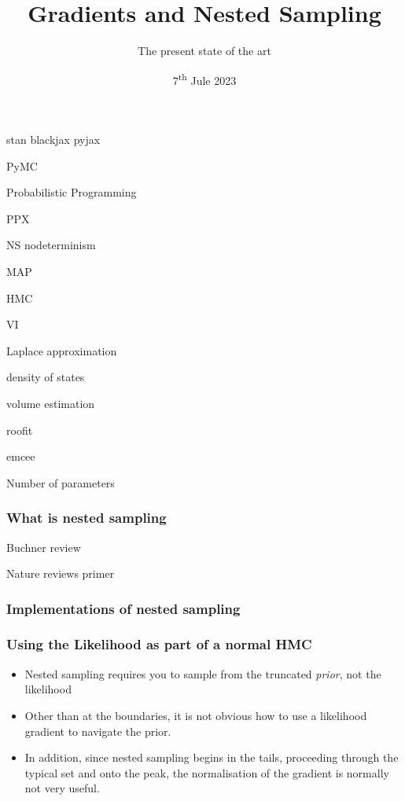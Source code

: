 \documentclass[aspectratio=169]{beamer}
\title{Gradients and Nested Sampling}
\subtitle{The present state of the art}
\date{7\textsuperscript{th} Jule 2023}
\begin{document}
\begin{frame}
    \titlepage
\end{frame}

\begin{frame}
    stan
    blackjax
    pyjax

    PyMC
    
    Probabilistic Programming

    PPX

    NS nodeterminism

    MAP
    
    HMC

    VI

    Laplace approximation

    density of states

    volume estimation

    roofit

    emcee

    Number of parameters
\end{frame}

\begin{frame}
    \frametitle{What is nested sampling}
    
    Buchner review 

    Nature reviews primer 

\end{frame}

\begin{frame}
    \frametitle{Implementations of nested sampling}
\end{frame}


\begin{frame}
    \frametitle{Using the Likelihood as part of a normal HMC}
    \begin{itemize}
        \item Nested sampling requires you to sample from the truncated \emph{prior}, not the likelihood
        \item Other than at the boundaries, it is not obvious how to use a likelihood gradient to navigate the prior.
        \item In addition, since nested sampling begins in the tails, proceeding through the typical set and onto the peak, the normalisation of the gradient is normally not very useful.
    \end{itemize}
\end{frame}
\end{document}
